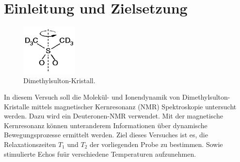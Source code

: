 \section{Einleitung und Zielsetzung}
\label{sec:Ziel}

\begin{figure}
	\centering
	\includegraphics[width=0.25\textwidth]{Plots/Probe.png}
	\caption{Dimethylsulton-Kristall.}
	\label{probe}
\end{figure}
In diesem Versuch soll die Molek\"{u}l- und Ionendynamik von Dimethylsulton-Kristalle mittels magnetischer Kernresonanz (NMR) Spektroskopie untersucht werden.
Dazu wird ein Deuteronen-NMR verwendet.
Mit der magnetische Kernresonanz k\"{o}nnen unteranderem Informationen \"{u}ber dynamische Bewegungsprozesse ermittelt werden.
Ziel dieses Versuches ist es, die Relaxationszeiten $T_1$ und $T_2$ der vorliegenden Probe zu bestimmen.
Sowie stimulierte Echos fu\"{u}r verschiedene Temperaturen aufzunehmen.

%
